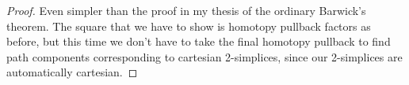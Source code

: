 \documentclass[main.tex]{subfiles}
\begin{document}
\begin{proof}
  Even simpler than the proof in my thesis of the ordinary Barwick's theorem. The square that we have to show is homotopy pullback factors as before, but this time we don't have to take the final homotopy pullback to find path components corresponding to cartesian 2-simplices, since our 2-simplices are automatically cartesian.
\end{proof}
\end{document}
